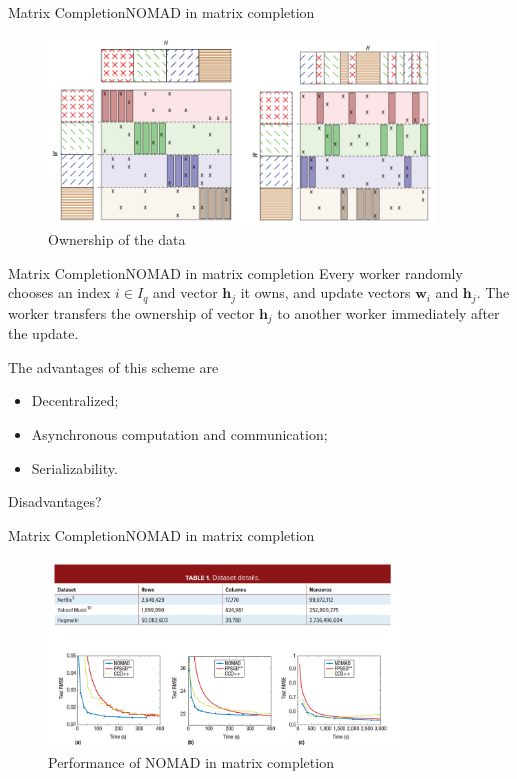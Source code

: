 \documentclass{beamer}
\renewcommand{\vec}{\mathbf}
\begin{document}
  \begin{frame}{Matrix Completion}{NOMAD in matrix completion}
    \begin{figure}
      \includegraphics[height = 5cm]{mc_data.png}
      \caption{Ownership of the data}
    \end{figure}
  \end{frame}
  
  \begin{frame}{Matrix Completion}{NOMAD in matrix completion}
    Every worker randomly chooses an index $i \in I_q$ and vector $\vec{h}_j$ it owns, and update vectors $\vec{w}_i$ and $\vec{h}_j$. The worker transfers the ownership of vector $\vec{h}_j$ to another worker immediately after the update. \par
    \pause
    The advantages of this scheme are
    \begin{itemize}
      \item Decentralized;
      \item Asynchronous computation and communication;
      \item Serializability.
    \end{itemize}
    \pause
    Disadvantages?
  \end{frame}
  
  \begin{frame}{Matrix Completion}{NOMAD in matrix completion}
    \begin{figure}
      \includegraphics[height = 5cm]{mc_perform.png}
      \caption{Performance of NOMAD in matrix completion}
    \end{figure}
  \end{frame}
\end{document}
